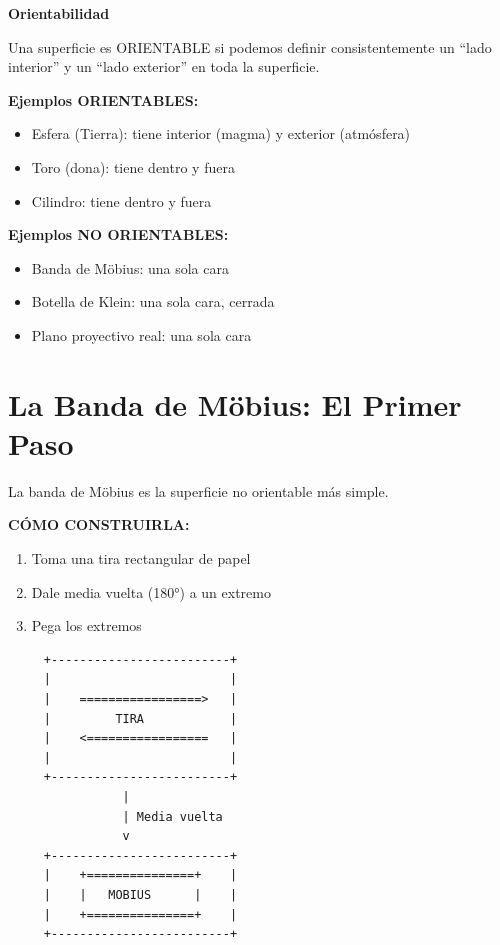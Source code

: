 \begin{nivelconceptual}
\textbf{Orientabilidad}

Una superficie es ORIENTABLE si podemos definir consistentemente
un ``lado interior'' y un ``lado exterior'' en toda la superficie.

\textbf{Ejemplos ORIENTABLES:}
\begin{itemize}
    \item Esfera (Tierra): tiene interior (magma) y exterior (atmósfera)
    \item Toro (dona): tiene dentro y fuera
    \item Cilindro: tiene dentro y fuera
\end{itemize}

\textbf{Ejemplos NO ORIENTABLES:}
\begin{itemize}
    \item Banda de Möbius: una sola cara
    \item Botella de Klein: una sola cara, cerrada
    \item Plano proyectivo real: una sola cara
\end{itemize}
\end{nivelconceptual}


\section{La Banda de Möbius: El Primer Paso}

La banda de Möbius es la superficie no orientable más simple.

\textbf{CÓMO CONSTRUIRLA:}
\begin{enumerate}
    \item Toma una tira rectangular de papel
    \item Dale media vuelta (180°) a un extremo
    \item Pega los extremos
\end{enumerate}

\begin{center}
\begin{verbatim}
     +-------------------------+
     |                         |
     |    =================>   |
     |         TIRA            |
     |    <=================   |
     |                         |
     +-------------------------+
                |
                | Media vuelta
                v
     +-------------------------+
     |    +===============+    |
     |    |   MOBIUS      |    |
     |    +===============+    |
     +-------------------------+
\end{verbatim}
\end{center}

